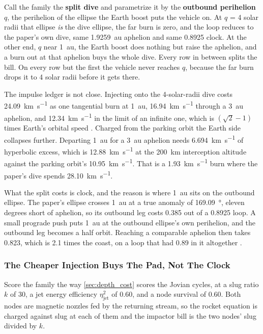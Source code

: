 \documentclass{article}
\begin{document}
Call the family the \textbf{split dive} and parametrize it by the \textbf{outbound perihelion} $q$, the perihelion of the ellipse the Earth boost puts the vehicle on. At $q$ = 4 solar radii that ellipse \emph{is} the dive ellipse, the far burn is zero, and the loop reduces to the paper's own dive, same \SI{1.9259}{\astronomicalunit} aphelion and same \SI{0.8925}{\year} clock. At the other end, $q$ near \SI{1}{\astronomicalunit}, the Earth boost does nothing but raise the aphelion, and a burn out at that aphelion buys the whole dive. Every row in between splits the bill. On every row but the first the vehicle never reaches $q$, because the far burn drops it to 4 solar radii before it gets there.

The impulse ledger is not close. Injecting onto the 4-solar-radii dive costs \SI{24.09}{\kilo\meter\per\second} as one tangential burn at \SI{1}{\astronomicalunit}, \SI{16.94}{\kilo\meter\per\second} through a \SI{3}{\astronomicalunit} aphelion, and \SI{12.34}{\kilo\meter\per\second} in the limit of an infinite one, which is $(\sqrt{2}-1)$ times Earth's orbital speed \cite{Katz_aim_is_all_you_need_2025}. Charged from the parking orbit the Earth side collapses further. Departing \SI{1}{\astronomicalunit} for a \SI{3}{\astronomicalunit} aphelion needs \SI{6.694}{\kilo\meter\per\second} of hyperbolic excess, which is \SI{12.88}{\kilo\meter\per\second} at the \SI{200}{\kilo\meter} interception altitude against the parking orbit's \SI{10.95}{\kilo\meter\per\second}. That is a \SI{1.93}{\kilo\meter\per\second} burn where the paper's dive spends \SI{28.10}{\kilo\meter\per\second}.

What the split costs is clock, and the reason is where \SI{1}{\astronomicalunit} sits on the outbound ellipse. The paper's ellipse crosses \SI{1}{\astronomicalunit} at a true anomaly of \SI{169.09}{\degree}, eleven degrees short of aphelion, so its outbound leg costs \SI{0.385}{\year} out of a \SI{0.8925}{\year} loop. A small prograde push puts \SI{1}{\astronomicalunit} at the outbound ellipse's own perihelion, and the outbound leg becomes a half orbit. Reaching a comparable aphelion then takes \SI{0.823}{\year}, which is 2.1 times the coast, on a loop that had \SI{0.89}{\year} in it altogether \cite{Katz_aim_is_all_you_need_2025}.

\subsubsection{The Cheaper Injection Buys The Pad, Not The Clock}\label{sec:split_dive_growth}
Score the family the way \autoref{sec:depth_cost} scores the Jovian cycles, at a slug ratio $k$ of 30, a jet energy efficiency $\eta_{\mathrm{jet}}^2$ of 0.60, and a node survival of 0.60. Both nodes are magnetic nozzles fed by the returning stream, so the rocket equation is charged against slug at each of them and the impactor bill is the two nodes' slug divided by $k$.
\end{document}
